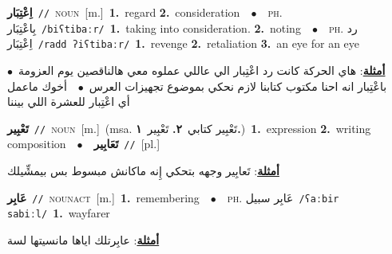 \documentclass[10pt,a4paper,twoside]{article} %
\begin{document}
\begin{multicols}{2}
{{{\setlength\topsep{0pt}\textbf{\foreignlanguage{arabic}{اِعْتِبَار}}\ {\color{gray}\texttt{//}\color{black}}\ \textsc{noun}\ [m.]\ \textbf{1.}~regard  \textbf{2.}~consideration\ \ $\bullet$\ \ \textsc{ph.} \color{gray} \foreignlanguage{arabic}{بِاعْتِبَار}\color{black}\ {\color{gray}\texttt{/{\sffamily biʕtibaːr}/}\color{black}}\ \textbf{1.}~taking into consideration.  \textbf{2.}~noting\ \ $\bullet$\ \ \textsc{ph.} \color{gray} \foreignlanguage{arabic}{رد اِعْتِبَار}\color{black}\ {\color{gray}\texttt{/{\sffamily radd ʔiʕtibaːr}/}\color{black}}\ \textbf{1.}~revenge  \textbf{2.}~retaliation  \textbf{3.}~an eye for an eye\  \begin{flushright}\color{gray}\foreignlanguage{arabic}{\textbf{\underline{\foreignlanguage{arabic}{أمثلة}}}: هاي الحركة كانت رد اعْتِبار الي عاللي عملوه معي هالناقصين يوم العزومة\ $\bullet$\ \  باعْتِبار انه احنا مكتوب كتابنا لازم نحكي بموضوع تجهيزات العرس\ $\bullet$\ \  أخوك ماعمل أي اعْتِبار للعشرة اللي بيننا}\end{flushright}\color{black}} \vspace{2mm}

{\setlength\topsep{0pt}\textbf{\foreignlanguage{arabic}{تَعْبِير}}\ {\color{gray}\texttt{//}\color{black}}\ \textsc{noun}\ [m.]\ \color{gray}(msa. \foreignlanguage{arabic}{تَعْبِير كتابي}~\foreignlanguage{arabic}{\textbf{٢.}}  \foreignlanguage{arabic}{تَعْبِير}~\foreignlanguage{arabic}{\textbf{١.}})\color{black}\ \textbf{1.}~expression  \textbf{2.}~writing composition\ \ $\bullet$\ \ \setlength\topsep{0pt}\textbf{\foreignlanguage{arabic}{تَعَابِير}}\ {\color{gray}\texttt{//}\color{black}}\ [pl.]\  \begin{flushright}\color{gray}\foreignlanguage{arabic}{\textbf{\underline{\foreignlanguage{arabic}{أمثلة}}}: تَعابِير وجهه بتحكي إِنه ماكانش مبسوط بس بيمشِّيلك}\end{flushright}\color{black}} \vspace{2mm}

{\setlength\topsep{0pt}\textbf{\foreignlanguage{arabic}{عَابِر}}\ {\color{gray}\texttt{//}\color{black}}\ \textsc{noun\textunderscore act}\ [m.]\ \textbf{1.}~remembering\ \ $\bullet$\ \ \textsc{ph.} \color{gray} \foreignlanguage{arabic}{عَابِر سبيل}\color{black}\ {\color{gray}\texttt{/{\sffamily ʕaːbir sabiːl}/}\color{black}}\ \textbf{1.}~wayfarer\  \begin{flushright}\color{gray}\foreignlanguage{arabic}{\textbf{\underline{\foreignlanguage{arabic}{أمثلة}}}: عابِرتلك اياها مانسيتها لسة}\end{flushright}\color{black}} \vspace{2mm}

}}
\end{multicols}
\end{document}
